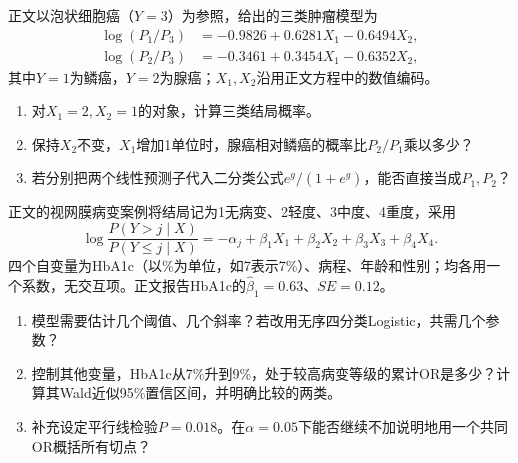 \par\addvspace{8pt}\noindent\begin{minipage}{\linewidth}


正文以泡状细胞癌（\(Y=3\)）为参照，给出的三类肿瘤模型为
\[\begin{aligned}
\log(P_1/P_3)&=-0.9826+0.6281X_1-0.6494X_2,\\
\log(P_2/P_3)&=-0.3461+0.3454X_1-0.6352X_2,
\end{aligned}\]
其中\(Y=1\)为鳞癌，\(Y=2\)为腺癌；\(X_1,X_2\)沿用正文方程中的数值编码。
\begin{enumerate}
\item 对\(X_1=2,X_2=1\)的对象，计算三类结局概率。
\item 保持\(X_2\)不变，\(X_1\)增加1单位时，腺癌相对鳞癌的概率比\(P_2/P_1\)乘以多少？
\item 若分别把两个线性预测子代入二分类公式\(e^g/(1+e^g)\)，能否直接当成\(P_1,P_2\)？
\end{enumerate}


\end{minipage}\par\vspace{5pt}

\par\addvspace{8pt}\noindent\begin{minipage}{\linewidth}


正文的视网膜病变案例将结局记为1无病变、2轻度、3中度、4重度，采用
\[\log\frac{P(Y>j\mid X)}{P(Y\le j\mid X)}
=-\alpha_j+\beta_1X_1+\beta_2X_2+\beta_3X_3+\beta_4X_4.\]
四个自变量为HbA1c（以\%为单位，如7表示7\%）、病程、年龄和性别；均各用一个系数，无交互项。正文报告HbA1c的\(\hat\beta_1=0.63\)、\(SE=0.12\)。
\begin{enumerate}
\item 模型需要估计几个阈值、几个斜率？若改用无序四分类Logistic，共需几个参数？
\item 控制其他变量，HbA1c从7\%升到9\%，处于较高病变等级的累计OR是多少？计算其Wald近似95\%置信区间，并明确比较的两类。
\item 补充设定平行线检验\(P=0.018\)。在\(\alpha=0.05\)下能否继续不加说明地用一个共同OR概括所有切点？
\end{enumerate}


\end{minipage}\par\vspace{5pt}

